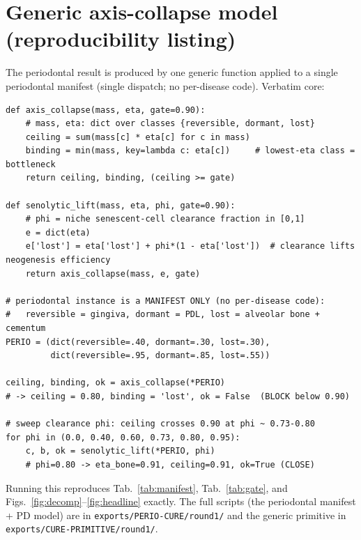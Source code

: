 \documentclass[11pt,a4paper]{article}
\begin{document}
\section{Generic axis-collapse model (reproducibility listing)}
\label{app:code}
The periodontal result is produced by one generic function applied to a single
periodontal manifest (single dispatch; no per-disease code). Verbatim core:

\begin{lstlisting}[basicstyle=\ttfamily\footnotesize,frame=single,xleftmargin=0pt,breaklines=true]
def axis_collapse(mass, eta, gate=0.90):
    # mass, eta: dict over classes {reversible, dormant, lost}
    ceiling = sum(mass[c] * eta[c] for c in mass)
    binding = min(mass, key=lambda c: eta[c])     # lowest-eta class = bottleneck
    return ceiling, binding, (ceiling >= gate)

def senolytic_lift(mass, eta, phi, gate=0.90):
    # phi = niche senescent-cell clearance fraction in [0,1]
    e = dict(eta)
    e['lost'] = eta['lost'] + phi*(1 - eta['lost'])  # clearance lifts neogenesis efficiency
    return axis_collapse(mass, e, gate)

# periodontal instance is a MANIFEST ONLY (no per-disease code):
#   reversible = gingiva, dormant = PDL, lost = alveolar bone + cementum
PERIO = (dict(reversible=.40, dormant=.30, lost=.30),
         dict(reversible=.95, dormant=.85, lost=.55))

ceiling, binding, ok = axis_collapse(*PERIO)
# -> ceiling = 0.80, binding = 'lost', ok = False  (BLOCK below 0.90)

# sweep clearance phi: ceiling crosses 0.90 at phi ~ 0.73-0.80
for phi in (0.0, 0.40, 0.60, 0.73, 0.80, 0.95):
    c, b, ok = senolytic_lift(*PERIO, phi)
    # phi=0.80 -> eta_bone=0.91, ceiling=0.91, ok=True (CLOSE)
\end{lstlisting}

\noindent Running this reproduces Tab.~\ref{tab:manifest}, Tab.~\ref{tab:gate}, and
Figs.~\ref{fig:decomp}--\ref{fig:headline} exactly. The full scripts (the periodontal
manifest + PD model) are in \texttt{exports/PERIO-CURE/round1/} and the generic
primitive in \texttt{exports/CURE-PRIMITIVE/round1/}.



\end{document}
